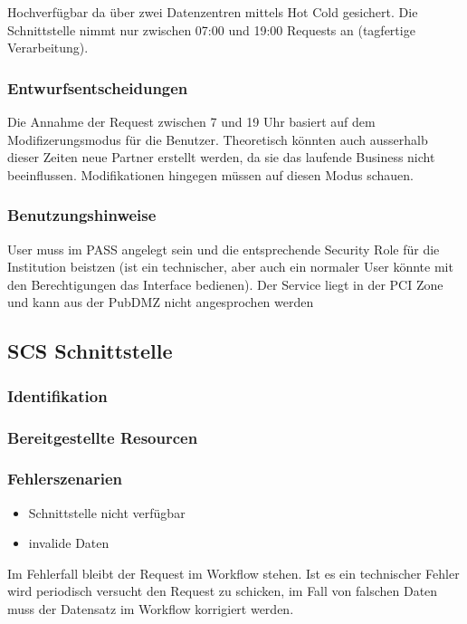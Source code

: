 Hochverfügbar da über zwei Datenzentren mittels Hot Cold gesichert.
Die Schnittstelle nimmt nur zwischen 07:00 und 19:00 Requests an (tagfertige Verarbeitung).
	
\subsubsection{Entwurfsentscheidungen} 

Die Annahme der Request zwischen 7 und 19 Uhr basiert auf dem Modifizerungsmodus für die Benutzer. Theoretisch könnten auch ausserhalb dieser Zeiten neue Partner erstellt werden, da sie das laufende Business nicht beeinflussen. Modifikationen hingegen müssen auf diesen Modus schauen.

\subsubsection{Benutzungshinweise} 

User muss im PASS angelegt sein und die entsprechende Security Role für die Institution beistzen (ist ein technischer, aber auch ein normaler User könnte mit den Berechtigungen das Interface bedienen).
Der Service liegt in der PCI Zone und kann aus der PubDMZ nicht angesprochen werden
	
\subsection{SCS Schnittstelle}

\subsubsection{Identifikation}

\subsubsection{Bereitgestellte Resourcen}

\subsubsection{Fehlerszenarien}

\begin{itemize}
	\item Schnittstelle nicht verfügbar
	\item invalide Daten
\end{itemize}
Im Fehlerfall bleibt der Request im Workflow stehen. Ist es ein technischer Fehler wird periodisch versucht den Request zu schicken, im Fall von falschen Daten muss der Datensatz im Workflow korrigiert werden.

